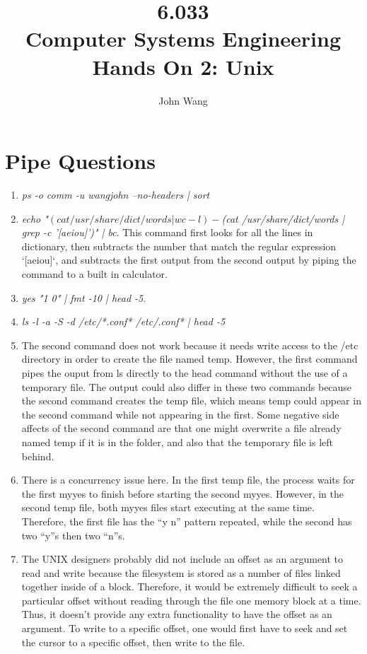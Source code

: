 \documentclass[psamsfonts]{amsart}
\title{6.033 \\
Computer Systems Engineering \\
Hands On 2: Unix}
\author{John Wang}
\begin{document}
\maketitle

\section{Pipe Questions}

\begin{enumerate}
  \item \emph{ps -o comm -u wangjohn --no-headers | sort}
  \item \emph{echo "$(cat /usr/share/dict/words | wc -l) - $(cat /usr/share/dict/words | grep -c '[aeiou]')" | bc}. This command first looks for all the lines in dictionary, then subtracts the number that match the regular expression `[aeiou]`, and subtracts the first output from the second output by piping the command to a built in calculator.
  \item \emph{yes "1 0" | fmt -10 | head -5}.
  \item \emph{ls -l -a -S -d /etc/*.conf* /etc/.conf* | head -5}
  \item The second command does not work because it needs write access to the /etc directory in order to create the file named temp. However, the first command pipes the ouput from ls directly to the head command without the use of a temporary file. The output could also differ in these two commands because the second command creates the temp file, which means temp could appear in the second command while not appearing in the first. Some negative side affects of the second command are that one might overwrite a file already named temp if it is in the folder, and also that the temporary file is left behind.
  \item There is a concurrency issue here. In the first temp file, the process waits for the first myyes to finish before starting the second myyes. However, in the second temp file, both myyes files start executing at the same time. Therefore, the first file has the ``y n'' pattern repeated, while the second has two ``y''s then two ``n''s. 
  \item The UNIX designers probably did not include an offset as an argument to read and write because the filesystem is stored as a number of files linked together inside of a block. Therefore, it would be extremely difficult to seek a particular offset without reading through the file one memory block at a time. Thus, it doesn't provide any extra functionality to have the offset as an argument. To write to a specific offset, one would first have to seek and set the cursor to a specific offset, then write to the file.

\end{enumerate}
\end{document}
